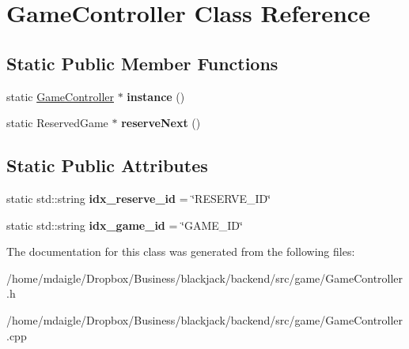 \hypertarget{classGameController}{
\section{\-Game\-Controller \-Class \-Reference}
\label{dc/d81/classGameController}
}
\subsection*{\-Static \-Public \-Member \-Functions}
\begin{DoxyCompactItemize}
\item 
\hypertarget{classGameController_a15a850a46d900359717e690fd1275e42}{
static \hyperlink{classGameController}{\-Game\-Controller} $\ast$ {\bfseries instance} ()}
\label{dc/d81/classGameController_a15a850a46d900359717e690fd1275e42}

\item 
\hypertarget{classGameController_ac349fe6722ce13b7bdaef953b302fd6c}{
static \-Reserved\-Game $\ast$ {\bfseries reserve\-Next} ()}
\label{dc/d81/classGameController_ac349fe6722ce13b7bdaef953b302fd6c}

\end{DoxyCompactItemize}
\subsection*{\-Static \-Public \-Attributes}
\begin{DoxyCompactItemize}
\item 
\hypertarget{classGameController_a39c21c8677a5ade00387b7b6e1ce7818}{
static std\-::string {\bfseries idx\-\_\-reserve\-\_\-id} = \char`\"{}\-R\-E\-S\-E\-R\-V\-E\-\_\-\-I\-D\char`\"{}}
\label{dc/d81/classGameController_a39c21c8677a5ade00387b7b6e1ce7818}

\item 
\hypertarget{classGameController_a4278bf90461e4dbf4a3f8fb72515710a}{
static std\-::string {\bfseries idx\-\_\-game\-\_\-id} = \char`\"{}\-G\-A\-M\-E\-\_\-\-I\-D\char`\"{}}
\label{dc/d81/classGameController_a4278bf90461e4dbf4a3f8fb72515710a}

\end{DoxyCompactItemize}


\-The documentation for this class was generated from the following files\-:\begin{DoxyCompactItemize}
\item 
/home/mdaigle/\-Dropbox/\-Business/blackjack/backend/src/game/\-Game\-Controller.\-h\item 
/home/mdaigle/\-Dropbox/\-Business/blackjack/backend/src/game/\-Game\-Controller.\-cpp\end{DoxyCompactItemize}
